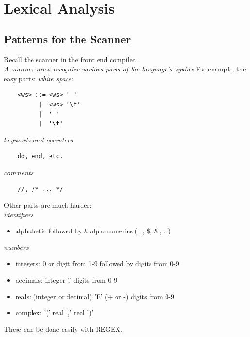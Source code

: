 \documentclass[10pt]{article}
\begin{document}
\section*{Lexical Analysis}
\subsection*{Patterns for the Scanner}
Recall the scanner in the front end compiler.\\
\textit{A scanner must recognize various parts of the language's syntax}
For example, the easy parts:
\textit{white space}:
\begin{verbatim}
    <ws> ::= <ws> ' '
          |  <ws> '\t'
          |  ' '
          |  '\t'
\end{verbatim}
\textit{keywords and operators}
\begin{verbatim}
    do, end, etc.
\end{verbatim}
\textit{comments}:
\begin{verbatim}
    //, /* ... */
\end{verbatim}
Other parts are much harder:\\
\textit{identifiers}
\begin{itemize}
    \item alphabetic followed by $k$ alphanumerics (\_, \$, \&, \dots)
\end{itemize}
\textit{numbers}
\begin{itemize}
    \item integers: 0 or digit from 1-9 followed by digits from 0-9
    \item decimals: integer '.' digits from 0-9
    \item reals: (integer or decimal) 'E' (+ or -) digits from 0-9
    \item complex: '(' real ',' real ')'
\end{itemize}
These can be done easily with REGEX.
\end{document}
